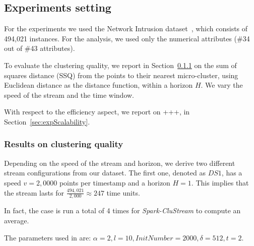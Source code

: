 \subsection{Experiments setting}
For the experiments we used the Network Intrusion dataset~\cite{}, which consists of 494,021 instances.%
For the analysis, we used only the numerical attributes (\#34 out of \#43 attributes).

To evaluate the clustering quality, we report in Section~\ref{sec:expQuality}  on the sum of squares distance (SSQ) from the points to their nearest micro-cluster, using Euclidean distance as the distance function, within a horizon $H$.
We vary the speed of the stream and \color{red}the time window\color{black}.

With respect to the efficiency aspect, we report on \color{red}+++\color{black}, in Section~\ref{sec:expScalability}. 



\subsubsection{Results on clustering quality}
\label{sec:expQuality}
Depending on the speed of the stream and horizon, we derive two different stream configurations from our dataset.
The first one, denoted as $DS1$, has a speed $v=2,0000$ points per timestamp and a horizon $H=1$. This implies that the stream lasts for $\frac{494,021}{2,000} \approx 247$ time units.


\color{red}In fact, the case is run a total of 4 times for \textit{Spark-CluStream} to compute an average. \color{black}

The parameters used in \cite{clustreamOrig} are: $\alpha=2,l=10,InitNumber=2000,\delta=512,t=2$.

